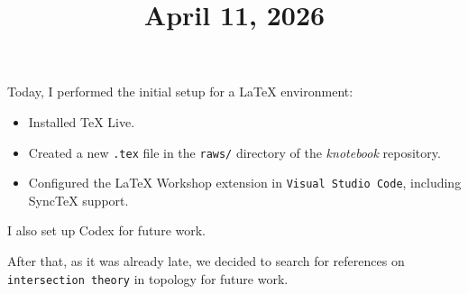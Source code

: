 \documentclass[11pt]{amsart}
\title{April 11, 2026}
\begin{document}
\maketitle

Today, I performed the initial setup for a LaTeX environment:
\begin{itemize}
    \item Installed TeX Live.
    \item Created a new \texttt{.tex} file in the \texttt{raws/} directory of the \textit{knotebook} repository.
    \item Configured the LaTeX Workshop extension in \texttt{Visual Studio Code}, including SyncTeX support.
\end{itemize}

I also set up Codex for future work. %


After that, as it was already late, we decided to search for references on \texttt{intersection theory} in topology for future work.





\end{document}
